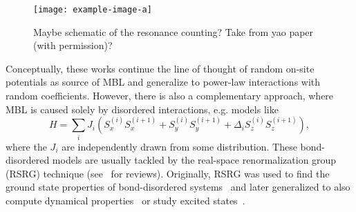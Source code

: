 
\begin{figure}[htb]
	\centering
	\texttt{[image: example-image-a]}
	\caption{Maybe schematic of the resonance counting? Take from yao paper (with permission)?}
\end{figure}


Conceptually, these works continue the line of thought of random on-site potentials as source of MBL and generalize to power-law interactions with random coefficients. However, there is also a complementary approach, where MBL is caused solely by disordered interactions, e.g. models like
\begin{equation}\label{eq:bond-disordered-XXZ}
	H = \sum_{i} J_{i} \left(S_x^{(i)}S_x^{(i+1)} + S_y^{(i)}S_y^{(i+1)} + \Delta_i S_z^{(i)}S_z^{(i+1)}\right),
\end{equation}
where the $J_{i}$ are independently drawn from some distribution. These bond-disordered models are usually tackled by the real-space renormalization group (RSRG) technique (see~\cite{igloiStrongDisorderRG2005,parameswaranEigenstatePhaseTransitions2017,igloiStrongDisorderRG2018,monthusStrongDisorderRenormalization2018} for reviews). Originally, RSRG was used to find the ground state properties of bond-disordered systems~\cite{dasguptaLowtemperaturePropertiesRandom1980,bhattScalingStudiesHighly1982,fisherRandomTransverseField1992,fisherRandomAntiferromagneticQuantum1994,fisherCriticalBehaviorRandom1995} and later generalized to also compute dynamical properties~\cite{voskManybodyLocalizationOne2013,voskDynamicalQuantumPhase2014,masonTimedependentRealspaceRenormalizationGroup2019,ruggieroQuantumInformationSpreading2022} or study excited states~\cite{pekkerHilbertGlassTransitionNew2014,vasseurQuantumCriticalityHot2015,vasseurParticleholeSymmetryManybody2016}.

